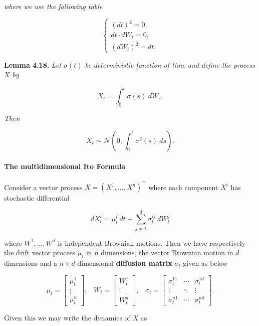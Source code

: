 \documentclass[
]{article}
\begin{document}
\emph{where we use the following table}

\[
\left\{\begin{matrix}(dt)^2=0,\\ dt\cdot dW_t=0,\\ (dW_t)^2=dt.\end{matrix}\right.
\]

\textbf{Lemma 4.18.} \emph{Let \(\sigma(t)\) be deterministic function
of time and define the process \(X\) by}

\[
X_t=\int_0^t \sigma(s)\ dW_s.\tag{4.37}
\]

\emph{Then}

\[
X_t\sim\mathcal{N}\left(0,\int_0^t\sigma^2(s)\ ds\right).
\]

\hypertarget{the-multidimensional-ito-formula}{%
\paragraph{The multidimensional Ito
Formula}\label{the-multidimensional-ito-formula}}

Consider a vector process \(X=(X^1,...,X^n)^\top\) where each component
\(X^i\) has stochastic differential

\[
d X_t^i=\mu_t^i\ dt+\sum_{j=1}^d\sigma^{ij}_t\ dW_t^j
\]

where \(W^1,...,W^d\) is independent Brownian motions. Then we have
respectively the drift vector process \(\mu_t\) in \(n\) dimensions, the
vector Brownian motion in \(d\) dimensions and a
\(n\times d\)-dimensional \textbf{diffusion matrix} \(\sigma_t\) given
as below

\[
\mu_t=\begin{bmatrix}\mu^1_t\\ \vdots\\ \mu^n_t\end{bmatrix},\hspace{10pt}W_t=\begin{bmatrix}W^1_t\\ \vdots\\ W^d_t\end{bmatrix},\hspace{10pt}\sigma_t=\begin{bmatrix}\sigma^{11}_t & \cdots & \sigma^{1d}_t \\ \vdots & \ddots & \vdots\\ \sigma^{n1}_t &\cdots& \sigma^{nd}_t\end{bmatrix}.
\]

Given this we may write the dynamics of \(X\) as
\end{document}
